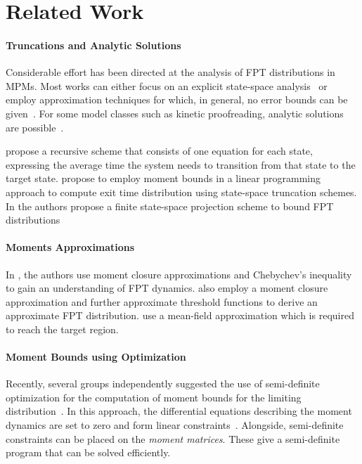 \section{Related Work}\label{sec:mfpt:related}
\paragraph{Truncations and Analytic Solutions} Considerable effort has been directed at the analysis of \acl{FPT}
distributions in \acp{MPM}. Most works can either focus on an explicit state-space
analysis~\cite{barzel2008calculation,munsky2009specificity,kuntz2019exit,kuntz2018approximation}
or employ approximation techniques for which, in general, no error bounds can be
given~\cite{schnoerr2017efficient,hayden2012fluid,bortolussi2014stochastic}.
For some model classes such as kinetic proofreading, analytic solutions are
possible~\cite{munsky2009specificity,bel2009simplicity,iyer2016first}.

\citet{barzel2008calculation} propose a recursive scheme that consists of one equation for
each state, expressing the average time the system needs to transition from that
state to the target state.
\citet{kuntz2018approximation} propose to employ moment bounds in a
linear programming approach to compute exit time distribution using state-space
truncation schemes. In \citet{kuntz2019exit} the authors propose a finite state-space
projection scheme to bound \acl{FPT} distributions

\paragraph{Moments Approximations} In \citet{hayden2012fluid}, the authors
use moment closure approximations and
Chebychev's inequality to gain an understanding of \acl{FPT} dynamics.
\citet{schnoerr2017efficient} also employ a moment closure approximation
and further approximate threshold functions to derive an approximate \acl{FPT}
distribution.
\citet{bortolussi2014stochastic} use a mean-field approximation
which is required to reach the target region.

\paragraph{Moment Bounds using Optimization} Recently, several groups independently suggested the use of semi-definite
optimization for the computation of moment bounds for the limiting
distribution~\cite{ghusinga2017exact,dowdy2018bounds,kuntz2017rigorous,sakurai2017convex}.
In this approach, the differential equations describing the moment dynamics are
set to zero and form linear constraints~\cite{backenkohler2018moment}. Alongside, semi-definite constraints can
be placed on the \emph{moment matrices}. These give a semi-definite program
that can be solved efficiently.

